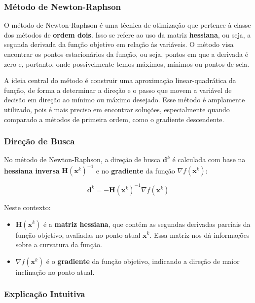 \documentclass[a4paper, 12pt]{article}
\begin{document}
\subsubsection{Método de Newton-Raphson}

O método de Newton-Raphson é uma técnica de otimização que pertence à classe dos métodos de \textbf{ordem dois}. Isso se refere ao uso da matriz \textbf{hessiana}, ou seja, a segunda derivada da função objetivo em relação às variáveis. O método visa encontrar os pontos estacionários da função, ou seja, pontos em que a derivada é zero e, portanto, onde possivelmente temos máximos, mínimos ou pontos de sela.

A ideia central do método é construir uma aproximação linear-quadrática da função, de forma a determinar a direção e o passo que movem a variável de decisão em direção ao mínimo ou máximo desejado. Esse método é amplamente utilizado, pois é mais preciso em encontrar soluções, especialmente quando comparado a métodos de primeira ordem, como o gradiente descendente.

\subsubsection*{Direção de Busca}

No método de Newton-Raphson, a direção de busca $\mathbf{d}^k$ é calculada com base na \textbf{hessiana inversa} $\mathbf{H}(\mathbf{x}^k)^{-1}$ e no \textbf{gradiente} da função $\nabla f(\mathbf{x}^k)$:

\begin{equation}
    \mathbf{d}^k = -\mathbf{H}(\mathbf{x}^k)^{-1} \nabla f(\mathbf{x}^k)
\end{equation}

Neste contexto:
\begin{itemize}
    \item $\mathbf{H}(\mathbf{x}^k)$ é a \textbf{matriz hessiana}, que contém as segundas derivadas parciais da função objetivo, avaliadas no ponto atual $\mathbf{x}^k$. Essa matriz nos dá informações sobre a curvatura da função.
    \item $\nabla f(\mathbf{x}^k)$ é o \textbf{gradiente} da função objetivo, indicando a direção de maior inclinação no ponto atual.
\end{itemize}

\subsubsection*{Explicação Intuitiva}
\end{document}
